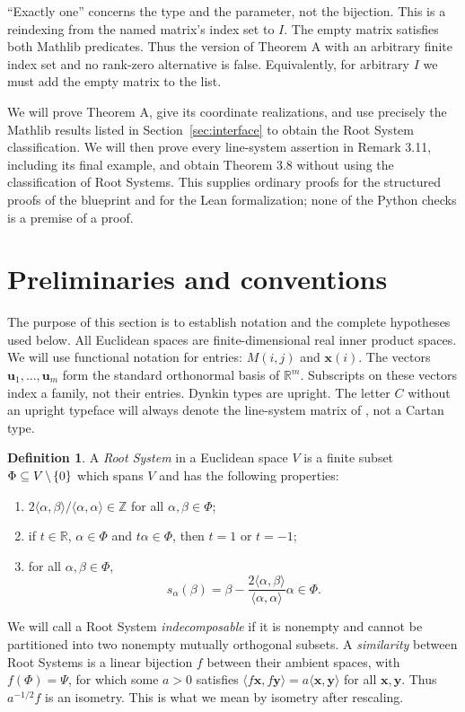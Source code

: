\documentclass[11pt]{amsart}
\newcommand\ints{{\mathbb Z}}
\newcommand\re{{\mathbb R}}%
\newcommand\Zu{{\mathbf u}}
\newcommand\Zy{{\mathbf y}}
\newcommand\Zx{{\mathbf x}}
\newcommand\diff{\mathbin{\mkern-1.5mu\setminus\mkern-1.5mu}}%
\newcommand\sbs{\subseteq}
\newcommand\ip[2]{\langle#1,#2\rangle}
\theoremstyle{definition}
\newtheorem{definition}[theorem]{Definition}
\newcommand{\lsq}[1]{\ip{#1}{#1}}
\begin{document}
``Exactly one'' concerns the type and the parameter, not the bijection.
This is a reindexing from the named matrix's index set to $I$.
The empty matrix satisfies both Mathlib predicates. Thus the version of
Theorem A with an arbitrary finite index set and no rank-zero alternative is
false. Equivalently, for arbitrary $I$ we must add the empty matrix to the list.

We will prove Theorem A, give its coordinate realizations, and use precisely
the Mathlib results listed in Section~\ref{sec:interface} to obtain the Root
System classification. We will then prove every line-system assertion in
Remark 3.11, including its final example, and obtain Theorem 3.8 without
using the classification of Root Systems. This supplies ordinary proofs for
the structured proofs of the blueprint and for the Lean formalization; none of
the Python checks is a premise of a proof.

\section{Preliminaries and conventions}\label{sec:prelim}

The purpose of this section is to establish notation and the complete
hypotheses used below. All Euclidean spaces are finite-dimensional real inner
product spaces. We will use functional notation for entries: $M(i,j)$ and
$\Zx(i)$. The vectors $\Zu_1,\ldots,\Zu_m$ form the standard orthonormal basis
of $\re^m$. Subscripts on these vectors index a family, not their entries.
Dynkin types are upright. The letter $C$ without an upright typeface will
always denote the line-system matrix of \cite{CGSS}, not a Cartan type.

\begin{definition}\label{def:roots}
A \emph{Root System} in a Euclidean space $V$ is a finite subset
$\Phi\sbs V\diff\{0\}$ which spans $V$ and has the following properties:
\begin{enumerate}
\item $2\ip{\alpha}{\beta}/\lsq{\alpha}\in\ints$ for all
      $\alpha,\beta\in\Phi$;
\item if $t\in\re$, $\alpha\in\Phi$ and $t\alpha\in\Phi$, then $t=1$ or $t=-1$;
\item for all $\alpha,\beta\in\Phi$,
\[
 s_\alpha(\beta)=\beta-
       \frac{2\ip{\alpha}{\beta}}{\lsq{\alpha}}\alpha\in\Phi.
\]
\end{enumerate}
We will call a Root System \emph{indecomposable} if it is nonempty and cannot
be partitioned into two nonempty mutually orthogonal subsets. A
\emph{similarity} between Root Systems is a linear bijection $f$ between their
ambient spaces, with $f(\Phi)=\Psi$, for which some $a>0$ satisfies
$\ip{f\Zx}{f\Zy}=a\ip{\Zx}{\Zy}$ for all $\Zx,\Zy$.
Thus $a^{-1/2}f$ is an isometry. This is what we mean by isometry after rescaling.
\end{definition}
\end{document}
